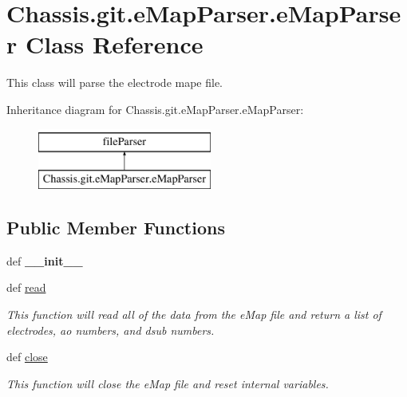 \hypertarget{class_chassis_8git_1_1e_map_parser_1_1e_map_parser}{\section{Chassis.\-git.\-e\-Map\-Parser.\-e\-Map\-Parser Class Reference}
\label{class_chassis_8git_1_1e_map_parser_1_1e_map_parser}
}


This class will parse the electrode mape file.  


Inheritance diagram for Chassis.\-git.\-e\-Map\-Parser.\-e\-Map\-Parser\-:\begin{figure}[H]
\begin{center}
\leavevmode
\includegraphics[height=2.000000cm]{class_chassis_8git_1_1e_map_parser_1_1e_map_parser}
\end{center}
\end{figure}
\subsection*{Public Member Functions}
\begin{DoxyCompactItemize}
\item 
\hypertarget{class_chassis_8git_1_1e_map_parser_1_1e_map_parser_a8dec5acc31b83f4d28beaeea7b67d5ec}{def {\bfseries \-\_\-\-\_\-init\-\_\-\-\_\-}}\label{class_chassis_8git_1_1e_map_parser_1_1e_map_parser_a8dec5acc31b83f4d28beaeea7b67d5ec}

\item 
def \hyperlink{class_chassis_8git_1_1e_map_parser_1_1e_map_parser_af1f4fa2ffd59311c892d21f112a3f077}{read}
\begin{DoxyCompactList}\small\item\em This function will read all of the data from the e\-Map file and return a list of electrodes, ao numbers, and dsub numbers. \end{DoxyCompactList}\item 
def \hyperlink{class_chassis_8git_1_1e_map_parser_1_1e_map_parser_a39db455af0a091dcb069428962180ad0}{close}
\begin{DoxyCompactList}\small\item\em This function will close the e\-Map file and reset internal variables. \end{DoxyCompactList}\end{DoxyCompactItemize}
